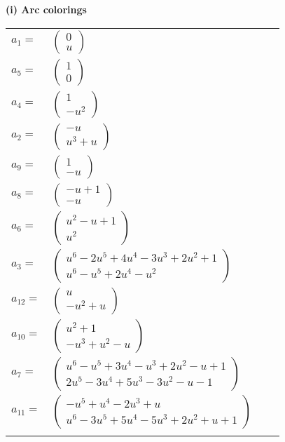 \documentclass[1p]{elsarticle_modified}
\theoremstyle{definition}
\begin{document}
\flushleft \textbf{(i) Arc colorings}\\
\begin{tabular}{m{7pt} m{180pt} m{7pt} m{180pt} }
\flushright $a_{1}=$&$\begin{pmatrix}0\\u\end{pmatrix}$ \\
\flushright $a_{5}=$&$\begin{pmatrix}1\\0\end{pmatrix}$ \\
\flushright $a_{4}=$&$\begin{pmatrix}1\\- u^2\end{pmatrix}$ \\
\flushright $a_{2}=$&$\begin{pmatrix}- u\\u^3+u\end{pmatrix}$ \\
\flushright $a_{9}=$&$\begin{pmatrix}1\\- u\end{pmatrix}$ \\
\flushright $a_{8}=$&$\begin{pmatrix}- u+1\\- u\end{pmatrix}$ \\
\flushright $a_{6}=$&$\begin{pmatrix}u^2- u+1\\u^2\end{pmatrix}$ \\
\flushright $a_{3}=$&$\begin{pmatrix}u^6-2 u^5+4 u^4-3 u^3+2 u^2+1\\u^6- u^5+2 u^4- u^2\end{pmatrix}$ \\
\flushright $a_{12}=$&$\begin{pmatrix}u\\- u^2+u\end{pmatrix}$ \\
\flushright $a_{10}=$&$\begin{pmatrix}u^2+1\\- u^3+u^2- u\end{pmatrix}$ \\
\flushright $a_{7}=$&$\begin{pmatrix}u^6- u^5+3 u^4- u^3+2 u^2- u+1\\2 u^5-3 u^4+5 u^3-3 u^2- u-1\end{pmatrix}$ \\
\flushright $a_{11}=$&$\begin{pmatrix}- u^5+u^4-2 u^3+u\\u^6-3 u^5+5 u^4-5 u^3+2 u^2+u+1\end{pmatrix}$\\&\end{tabular}
\end{document}
